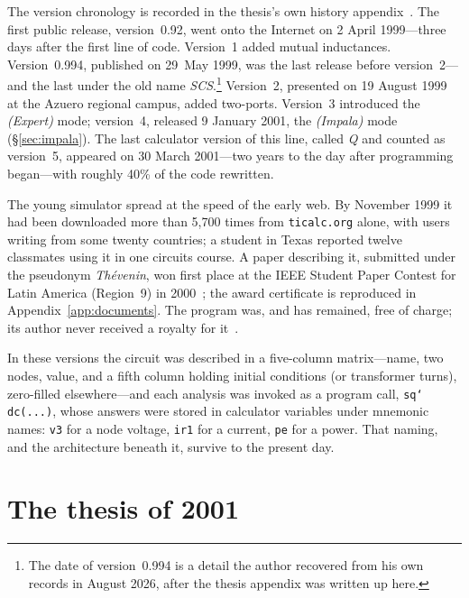 \documentclass[11pt,oneside]{report}
\newcommand{\code}[1]{\texttt{#1}}
\begin{document}
The version chronology is recorded in the thesis's own history
appendix~\cite[App.~A]{thesis2000}. The first public release,
version~0.92, went onto the Internet on 2 April 1999---three days
after the first line of code. Version~1 added mutual inductances.
Version~0.994, published on 29~May 1999, was the last release before
version~2---and the last under the old name \emph{SCS}.\footnote{The
date of version~0.994 is a detail the author recovered from his own
records in August 2026, after the thesis appendix was written up
here.} Version~2, presented on 19 August 1999 at the Azuero regional
campus, added two-ports. Version~3 introduced the \emph{(Expert)} mode;
version~4, released 9 January 2001, the \emph{(Impala)} mode
(\S\ref{sec:impala}). The last calculator version of this line,
called \emph{Q} and counted as version~5, appeared on 30 March
2001---two years to the day after programming began---with roughly
40\% of the code rewritten.

The young simulator spread at the speed of the early web. By November
1999 it had been downloaded more than 5{,}700 times from
\code{ticalc.org} alone, with users writing from some twenty
countries; a student in Texas reported twelve classmates using it in
one circuits course. A paper describing it, submitted under the
pseudonym \emph{Th\'evenin}, won first place at the IEEE Student
Paper Contest for Latin America (Region~9) in 2000~\cite{paper1999};
the award certificate is reproduced in
Appendix~\ref{app:documents}. The program was, and has remained,
free of charge; its author never received a royalty for
it~\cite[App.~A]{thesis2000}.

In these versions the circuit was described in a five-column
matrix---name, two nodes, value, and a fifth column holding initial
conditions (or transformer turns), zero-filled elsewhere---and each
analysis was invoked as a program call, \code{sq\char`\\dc(...)},
whose answers were stored in calculator variables under mnemonic
names: \code{v3} for a node voltage, \code{ir1} for a current,
\code{pe} for a power. That naming, and the architecture beneath it,
survive to the present day.

\section{The thesis of 2001}
\label{sec:thesis}
\end{document}
